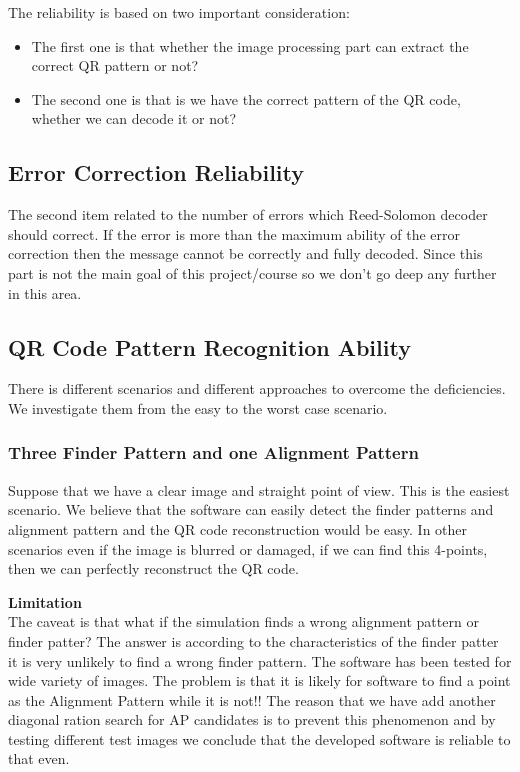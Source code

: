 The reliability is based on two important consideration:

\begin{itemize}
\item The first one is that whether the image processing part can extract the correct QR pattern or not?

\item The second one is that is we have the correct pattern of the QR code, whether we can decode it or not?
\end{itemize}

\subsection{Error Correction Reliability}
The second item related to the number of errors which Reed-Solomon decoder should correct. If the error is more than the maximum ability of the error correction then the message cannot be correctly and fully decoded. Since this part is not the main goal of this project/course so we don't go deep any further in this area.

\subsection{QR Code Pattern Recognition Ability}

There is different scenarios and different approaches to overcome the deficiencies. We investigate them from the easy to the worst case scenario.

\subsubsection{Three Finder Pattern and one Alignment Pattern}

Suppose that we have a clear image and straight point of view. This is the easiest scenario. We believe that the software can easily detect the finder patterns and alignment pattern and the QR code reconstruction would be easy. In other scenarios even if the image is blurred or damaged, if we can find this 4-points, then we can perfectly reconstruct the QR code.

\textbf{Limitation} \\

The caveat is that what if the simulation finds a wrong alignment pattern or finder patter? The answer is according to the characteristics of the finder patter it is very unlikely to find a wrong finder pattern. The software has been tested for wide variety of images. The problem is that it is likely for software to find a point as the Alignment Pattern while it is not!! The reason that we have add another diagonal ration search for AP candidates is to prevent this phenomenon and by testing different test images we conclude that the developed software is reliable to that even.

